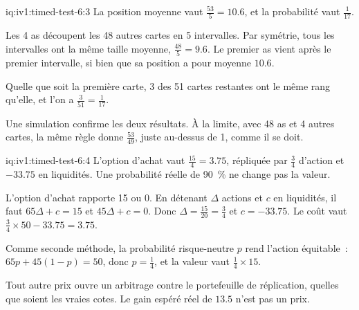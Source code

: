 \begin{solution}{iq:iv1:timed-test-6:3}
La position moyenne vaut $\frac{53}{5} = 10.6$, et la probabilité vaut $\frac{1}{17}$.

Les 4 as découpent les 48 autres cartes en 5 intervalles. Par symétrie, tous les intervalles ont la même taille moyenne, $\frac{48}{5} = 9.6$. Le premier as vient après le premier intervalle, si bien que sa position a pour moyenne $10.6$.

Quelle que soit la première carte, 3 des 51 cartes restantes ont le même rang qu'elle, et l'on a $\frac{3}{51} = \frac{1}{17}$.

Une simulation confirme les deux résultats. À la limite, avec 48 as et 4 autres cartes, la même règle donne $\frac{53}{49}$, juste au-dessus de 1, comme il se doit.

\end{solution}

\begin{solution}{iq:iv1:timed-test-6:4}
L'option d'achat vaut $\frac{15}{4} = 3.75$, répliquée par $\frac34$ d'action et $-33.75$ en liquidités. Une probabilité réelle de 90~\% ne change pas la valeur.

L'option d'achat rapporte 15 ou 0. En détenant $\Delta$ actions et $c$ en liquidités, il faut $65\Delta + c = 15$ et $45\Delta + c = 0$. Donc $\Delta = \frac{15}{20} = \frac34$ et $c = -33.75$. Le coût vaut $\frac34 \times 50 - 33.75 = 3.75$.

Comme seconde méthode, la probabilité risque-neutre $p$ rend l'action équitable~: $65p + 45(1 - p) = 50$, donc $p = \frac14$, et la valeur vaut $\frac14 \times 15$.

Tout autre prix ouvre un arbitrage contre le portefeuille de réplication, quelles que soient les vraies cotes. Le gain espéré réel de $13.5$ n'est pas un prix.

\end{solution}


